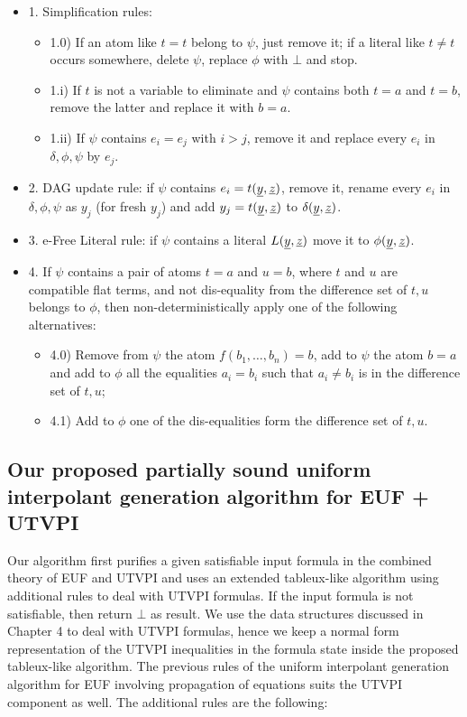 \begin{itemize}
  \item[] 1. Simplification rules:
    \begin{itemize}
      \item 1.0) If an atom like $t = t$ belong to $\psi$, just remove it; if a
      literal like $t \neq t$ occurs somewhere, delete $\psi$, replace $\phi$
      with $\bot$ and stop.
    \item 1.i) If $t$ is not a variable to eliminate and $\psi$ contains
    both $t = a$ and $t = b$, remove the latter and replace it with $b = a$.
  \item 1.ii) If $\psi$ contains $e_i = e_j$ with $i > j$, remove it
  and replace every $e_i$ in $\delta, \phi, \psi$ by $e_j$.
    \end{itemize}
  \item[] 2. DAG update rule: if $\psi$ contains $e_i = t(\underline{y}, \underline{z})$, remove
    it, rename every $e_i$ in $\delta, \phi, \psi$ as $y_j$ (for fresh $y_j$)
    and add $y_j = t(\underline{y}, \underline{z})$ to $\delta(\underline{y}, \underline{z})$.
  \item[] 3.  e-Free Literal rule: if $\psi$ contains a literal $L(\underline{y}, \underline{z})$
    move it to $\phi(\underline{y}, \underline{z})$.
  \item[] 4.  If $\psi$ contains a pair of atoms $t = a$ and $u = b$, where
    $t$ and $u$ are compatible flat terms, and not dis-equality from the difference
    set of $t, u$ belongs to $\phi$, then non-deterministically apply one of the
    following alternatives:
    \begin{itemize}
      \item 4.0) Remove from $\psi$ the atom $f(b_1, \dots, b_n) = b$, add
      to $\psi$ the atom $b = a$ and add to $\phi$ all the equalities
      $a_i = b_i$ such that $a_i \neq b_i$ is in the difference set of $t, u$;
      \item 4.1) Add to $\phi$ one of the dis-equalities form the difference
      set of $t, u$.
    \end{itemize}
\end{itemize}

\subsection{Our proposed partially sound 
uniform interpolant generation algorithm 
for EUF + UTVPI}

Our algorithm first purifies a given satisfiable 
input formula in the
combined theory of EUF and UTVPI and 
uses an extended tableux-like algorithm
using additional rules to deal with UTVPI formulas. 
If the input formula is not satisfiable, 
then return $\bot$ as result. 
We use the data structures discussed 
in Chapter 4 to deal with UTVPI formulas,
hence we keep a normal form representation 
of the UTVPI inequalities in the
formula state inside the proposed 
tableux-like algorithm.
The previous rules of the uniform interpolant 
generation algorithm
for EUF involving propagation of equations 
suits the UTVPI component as well. 
The additional rules are the following:

